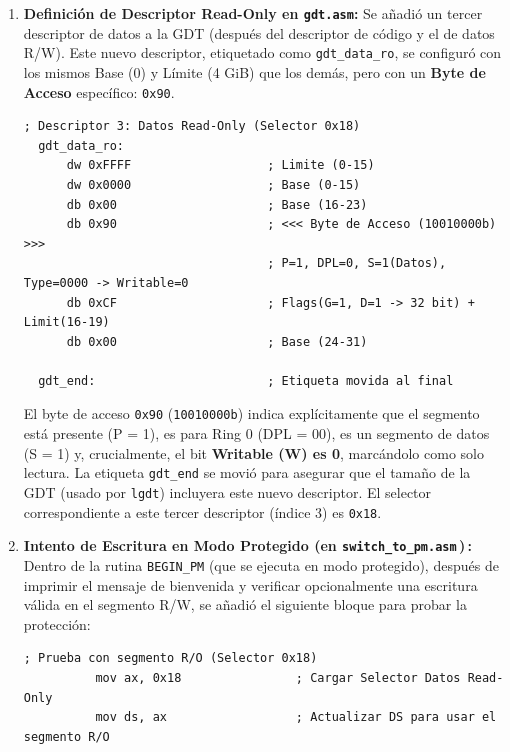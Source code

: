 \begin{enumerate}
    \item \textbf{Definición de Descriptor Read-Only en \texttt{gdt.asm}:}
          Se añadió un tercer descriptor de datos a la GDT (después del descriptor de código y el de datos R/W).
          Este nuevo descriptor, etiquetado como \texttt{gdt\_data\_ro}, se configuró con los mismos Base (0)
          y Límite (4 GiB) que los demás, pero con un \textbf{Byte de Acceso} específico: \texttt{0x90}.
  
          \begin{lstlisting}[style=NasmStyle,
            caption={Descriptor Read-Only en \texttt{gdt.asm}}, numbers=none]
  ; Descriptor 3: Datos Read-Only (Selector 0x18)
  gdt_data_ro:
      dw 0xFFFF                   ; Limite (0-15)
      dw 0x0000                   ; Base (0-15)
      db 0x00                     ; Base (16-23)
      db 0x90                     ; <<< Byte de Acceso (10010000b) >>>
                                  ; P=1, DPL=0, S=1(Datos), Type=0000 -> Writable=0
      db 0xCF                     ; Flags(G=1, D=1 -> 32 bit) + Limit(16-19)
      db 0x00                     ; Base (24-31)
  
  gdt_end:                        ; Etiqueta movida al final
          \end{lstlisting}
  
          El byte de acceso \texttt{0x90} (\texttt{10010000b}) indica explícitamente que el segmento
          está presente (P = 1), es para Ring 0 (DPL = 00), es un segmento de datos (S = 1) y,
          crucialmente, el bit \textbf{Writable (W) es 0}, marcándolo como solo lectura.
          La etiqueta \texttt{gdt\_end} se movió para asegurar que el tamaño de la GDT (usado por
          \texttt{lgdt}) incluyera este nuevo descriptor.  
          El selector correspondiente a este tercer descriptor (índice 3) es \texttt{0x18}.
  
    \item \textbf{Intento de Escritura en Modo Protegido (en
          \texttt{switch\_to\_pm.asm}\,)\,:} %
          Dentro de la rutina \texttt{BEGIN\_PM} (que se ejecuta en modo protegido), después de imprimir el
          mensaje de bienvenida y verificar opcionalmente una escritura válida en el segmento R/W,
          se añadió el siguiente bloque para probar la protección:
  
          \begin{lstlisting}[style=NasmStyle,
            caption={Intento de escritura R/O en \texttt{switch\_to\_pm.asm}}, % <-  \_
            numbers=none]
          ; Prueba con segmento R/O (Selector 0x18)
          mov ax, 0x18                ; Cargar Selector Datos Read-Only
          mov ds, ax                  ; Actualizar DS para usar el segmento R/O
          

\end{lstlisting}
\end{enumerate}

